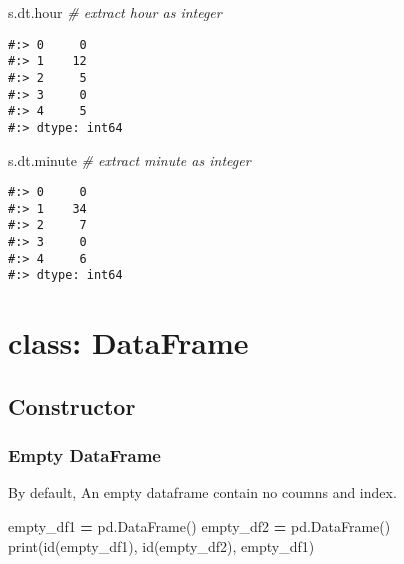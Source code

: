 \documentclass[
]{book}
\newenvironment{Shaded}{\begin{snugshade}}{\end{snugshade}}
\newcommand{\BuiltInTok}[1]{#1}
\newcommand{\CommentTok}[1]{\textcolor[rgb]{0.37,0.37,0.37}{\textit{#1}}}
\newcommand{\NormalTok}[1]{#1}
\newcommand{\OperatorTok}[1]{\textcolor[rgb]{0.43,0.43,0.43}{\textbf{#1}}}
\begin{document}
\begin{Shaded}
\begin{Highlighting}[]
\NormalTok{s.dt.hour  }\CommentTok{\# extract hour as integer}
\end{Highlighting}
\end{Shaded}

\begin{verbatim}
#:> 0     0
#:> 1    12
#:> 2     5
#:> 3     0
#:> 4     5
#:> dtype: int64
\end{verbatim}

\begin{Shaded}
\begin{Highlighting}[]
\NormalTok{s.dt.minute }\CommentTok{\# extract minute as integer}
\end{Highlighting}
\end{Shaded}

\begin{verbatim}
#:> 0     0
#:> 1    34
#:> 2     7
#:> 3     0
#:> 4     6
#:> dtype: int64
\end{verbatim}

\hypertarget{class-dataframe}{%
\section{class: DataFrame}\label{class-dataframe}}

\hypertarget{constructor-10}{%
\subsection{Constructor}\label{constructor-10}}

\hypertarget{empty-dataframe}{%
\subsubsection{Empty DataFrame}\label{empty-dataframe}}

By default, An empty dataframe contain no coumns and index.

\begin{Shaded}
\begin{Highlighting}[]
\NormalTok{empty\_df1 }\OperatorTok{=}\NormalTok{ pd.DataFrame()}
\NormalTok{empty\_df2 }\OperatorTok{=}\NormalTok{ pd.DataFrame()}
\BuiltInTok{print}\NormalTok{(}\BuiltInTok{id}\NormalTok{(empty\_df1), }\BuiltInTok{id}\NormalTok{(empty\_df2), empty\_df1)}
\end{Highlighting}
\end{Shaded}
\end{document}
